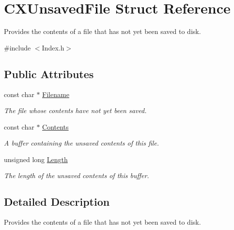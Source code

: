 \hypertarget{structCXUnsavedFile}{}\section{C\+X\+Unsaved\+File Struct Reference}
\label{structCXUnsavedFile}


Provides the contents of a file that has not yet been saved to disk.  




{\ttfamily \#include $<$Index.\+h$>$}

\subsection*{Public Attributes}
\begin{DoxyCompactItemize}
\item 
const char $\ast$ \hyperlink{structCXUnsavedFile_aa8bf5d4351628ee8502b517421e8b418}{Filename}
\begin{DoxyCompactList}\small\item\em The file whose contents have not yet been saved. \end{DoxyCompactList}\item 
\mbox{\label{structCXUnsavedFile_afaa926937db049b854f17f995bbc8d47}} 
const char $\ast$ \hyperlink{structCXUnsavedFile_afaa926937db049b854f17f995bbc8d47}{Contents}
\begin{DoxyCompactList}\small\item\em A buffer containing the unsaved contents of this file. \end{DoxyCompactList}\item 
\mbox{\label{structCXUnsavedFile_aee644cd64b25d8ed0ab92a1016fad9a8}} 
unsigned long \hyperlink{structCXUnsavedFile_aee644cd64b25d8ed0ab92a1016fad9a8}{Length}
\begin{DoxyCompactList}\small\item\em The length of the unsaved contents of this buffer. \end{DoxyCompactList}\end{DoxyCompactItemize}


\subsection{Detailed Description}
Provides the contents of a file that has not yet been saved to disk. 

